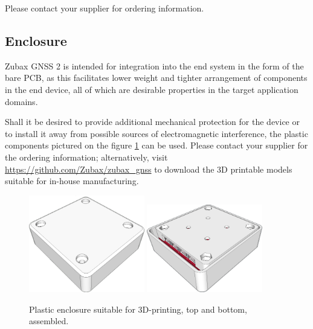 \documentclass{zubaxdoc}
\begin{document}
Please contact your supplier for ordering information.

\subsection{Enclosure}\label{sec:enclosure}

Zubax GNSS 2 is intended for integration into the end system in the form of the bare PCB,
as this facilitates lower weight and tighter arrangement of components
in the end device, all of which are desirable properties in the target application domains.

Shall it be desired to provide additional mechanical protection for the device or to install it away from possible sources of electromagnetic interference, the plastic components pictured on the figure \ref{enclosure} can be used.
Please contact your supplier for the ordering information;
alternatively, visit \url{https://github.com/Zubax/zubax_gnss} to download
the 3D printable models suitable for in-house manufacturing.

\begin{figure}[hbt]
	\centering
	\includegraphics[width=0.45\textwidth]{enclosure_assembled_top}
	\includegraphics[width=0.45\textwidth]{enclosure_assembled_bottom}
	\caption{Plastic enclosure suitable for 3D-printing, top and bottom, assembled.\label{enclosure}}
\end{figure}
\end{document}
